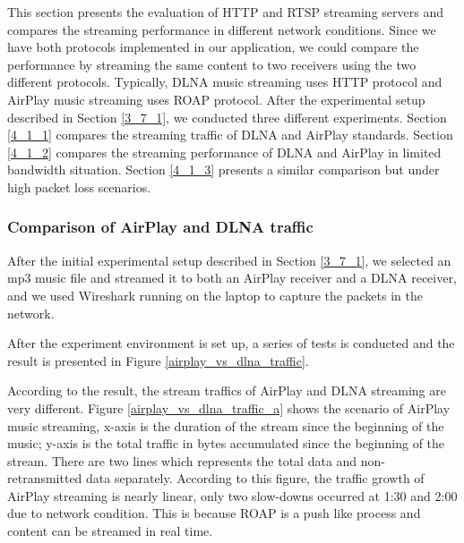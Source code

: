 This section presents the evaluation of HTTP and RTSP streaming servers and
compares the streaming performance in different network conditions. Since we
have both protocols implemented in our application, we could compare the
performance by streaming the same content to two receivers using the two
different protocols. Typically, DLNA music streaming uses HTTP protocol and
AirPlay music streaming uses ROAP protocol. After the experimental setup
described in Section \ref{3_7_1}, we conducted three different experiments.
Section \ref{4_1_1} compares the streaming traffic of DLNA and AirPlay
standards. Section \ref{4_1_2} compares the streaming performance of DLNA and
AirPlay in limited bandwidth situation. Section \ref{4_1_3} presents a
similar comparison but under high packet loss scenarios.
\subsubsection{Comparison of AirPlay and DLNA traffic\label{4_1_1}}
After the initial experimental setup described in Section \ref{3_7_1}, we
selected an mp3 music file and streamed it to both an AirPlay receiver
and a DLNA receiver, and we used Wireshark running on the laptop to capture the
packets in the network.

After the experiment environment is set up, a series of tests is conducted and
the result is presented in Figure \ref{airplay_vs_dlna_traffic}.

According to the result, the stream traffics of AirPlay and DLNA streaming are
very different. Figure \ref{airplay_vs_dlna_traffic_a} shows the scenario of
AirPlay music streaming, x-axis is the duration of the stream since the
beginning of the music; y-axis is the total traffic in bytes accumulated since
the beginning of the stream. There are two lines which represents the total
data and non-retransmitted data separately. According to this figure, the
traffic growth of AirPlay streaming is nearly linear, only two slow-downs
occurred at 1:30 and 2:00 due to network condition. This is because ROAP is a
push like process and content can be streamed in real time.

